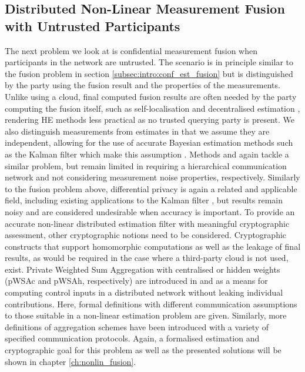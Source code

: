 \subsection{Distributed Non-Linear Measurement Fusion with Untrusted Participants}\label{subsec:intro:conf_nonlin_measurements}
The next problem we look at is confidential measurement fusion when participants in the network are untrusted. The scenario is in principle similar to the fusion problem in section \ref{subsec:intro:conf_est_fusion} but is distinguished by the party using the fusion result and the properties of the measurements. Unlike using a cloud, final computed fusion results are often needed by the party computing the fusion itself, such as self-localisation and decentralised estimation \cite{sridharCooperativePerceptionAutonomous2019,grimeDataFusionDecentralized1994,pintoSelflocalisationIndoorMobile2013}, rendering HE methods less practical as no trusted querying party is present. We also distinguish measurements from estimates in that we assume they are independent, allowing for the use of accurate Bayesian estimation methods such as the Kalman filter which make this assumption \cite{haugBayesianEstimationTracking2012}. Methods \cite{aristovEncryptedMultisensorInformation2018} and \cite{alanwarPrOLocResilientLocalization2017} again tackle a similar problem, but remain limited in requiring a hierarchical communication network and not considering measurement noise properties, respectively. Similarly to the fusion problem above, differential privacy \cite{dworkDifferentialPrivacySurvey2008} is again a related and applicable field, including existing applications to the Kalman filter \cite{nyDifferentiallyPrivateKalman2012}, but results remain noisy and are considered undesirable when accuracy is important. To provide an accurate non-linear distributed estimation filter with meaningful cryptographic assessment, other cryptographic notions need to be considered. Cryptographic constructs that support homomorphic computations as well as the leakage of final results, as would be required in the case where a third-party cloud is not used, exist. Private Weighted Sum Aggregation with centralised or hidden weights (pWSAc and pWSAh, respectively) are introduced in \cite{schulzedarupEncryptedCooperativeControl2019} and \cite{alexandruPrivateWeightedSum2020} as a means for computing control inputs in a distributed network without leaking individual contributions. Here, formal definitions with different communication assumptions to those suitable in a non-linear estimation problem are given. Similarly, more definitions of aggregation schemes have been introduced \cite{shiPrivacyPreservingAggregationTimeSeries2011,joyeScalableSchemePrivacyPreserving2013,benhamoudaNewFrameworkPrivacyPreserving2016,darcoProbabilisticSecretSharing2018,beckerRevisitingPrivateStream2018,chanPrivacyPreservingStreamAggregation2012} with a variety of specified communication protocols. Again, a formalised estimation and cryptographic goal for this problem as well as the presented solutions will be shown in chapter \ref{ch:nonlin_fusion}.

